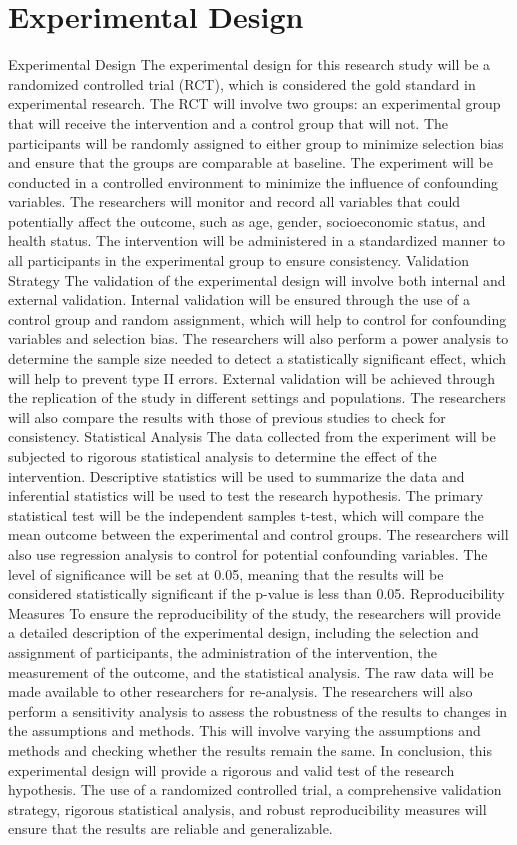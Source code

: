 \documentclass[conference]{IEEEtran}
\begin{document}
\section{Experimental Design}
Experimental Design The experimental design for this research study will be a randomized controlled trial (RCT), which is considered the gold standard in experimental research. The RCT will involve two groups: an experimental group that will receive the intervention and a control group that will not. The participants will be randomly assigned to either group to minimize selection bias and ensure that the groups are comparable at baseline. The experiment will be conducted in a controlled environment to minimize the influence of confounding variables. The researchers will monitor and record all variables that could potentially affect the outcome, such as age, gender, socioeconomic status, and health status. The intervention will be administered in a standardized manner to all participants in the experimental group to ensure consistency. Validation Strategy The validation of the experimental design will involve both internal and external validation. Internal validation will be ensured through the use of a control group and random assignment, which will help to control for confounding variables and selection bias. The researchers will also perform a power analysis to determine the sample size needed to detect a statistically significant effect, which will help to prevent type II errors. External validation will be achieved through the replication of the study in different settings and populations. The researchers will also compare the results with those of previous studies to check for consistency. Statistical Analysis The data collected from the experiment will be subjected to rigorous statistical analysis to determine the effect of the intervention. Descriptive statistics will be used to summarize the data and inferential statistics will be used to test the research hypothesis. The primary statistical test will be the independent samples t-test, which will compare the mean outcome between the experimental and control groups. The researchers will also use regression analysis to control for potential confounding variables. The level of significance will be set at 0.05, meaning that the results will be considered statistically significant if the p-value is less than 0.05. Reproducibility Measures To ensure the reproducibility of the study, the researchers will provide a detailed description of the experimental design, including the selection and assignment of participants, the administration of the intervention, the measurement of the outcome, and the statistical analysis. The raw data will be made available to other researchers for re-analysis. The researchers will also perform a sensitivity analysis to assess the robustness of the results to changes in the assumptions and methods. This will involve varying the assumptions and methods and checking whether the results remain the same. In conclusion, this experimental design will provide a rigorous and valid test of the research hypothesis. The use of a randomized controlled trial, a comprehensive validation strategy, rigorous statistical analysis, and robust reproducibility measures will ensure that the results are reliable and generalizable.
\end{document}
